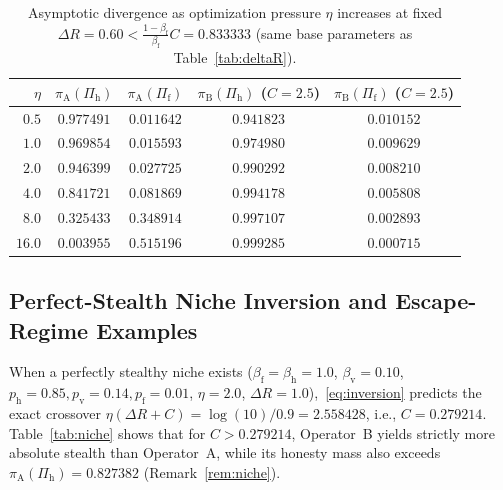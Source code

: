 \documentclass[11pt,a4paper]{article}
\begin{document}
\begin{table}[ht]
\centering
\caption{Asymptotic divergence as optimization pressure $\eta$ increases at fixed $\Delta R = 0.60 < \frac{1-\beta_{\mathrm{f}}}{\beta_{\mathrm{f}}}C = 0.833333$ (same base parameters as Table~\ref{tab:deltaR}).}
\label{tab:eta}
\small
\begin{tabular}{@{}rcccc@{}}
\toprule
$\eta$ & $\pi_{\mathrm{A}}(\Pi_{\mathrm{h}})$ & $\pi_{\mathrm{A}}(\Pi_{\mathrm{f}})$ & $\pi_{\mathrm{B}}(\Pi_{\mathrm{h}})$ ($C=2.5$) & $\pi_{\mathrm{B}}(\Pi_{\mathrm{f}})$ ($C=2.5$) \\
\midrule
$0.5$ & $0.977491$ & $0.011642$ & $0.941823$ & $0.010152$ \\
$1.0$ & $0.969854$ & $0.015593$ & $0.974980$ & $0.009629$ \\
$2.0$ & $0.946399$ & $0.027725$ & $0.990292$ & $0.008210$ \\
$4.0$ & $0.841721$ & $0.081869$ & $0.994178$ & $0.005808$ \\
$8.0$ & $0.325433$ & $0.348914$ & $0.997107$ & $0.002893$ \\
$16.0$ & $\mathbf{0.003955}$ & $\mathbf{0.515196}$ & $\mathbf{0.999285}$ & $\mathbf{0.000715}$ \\
\bottomrule
\end{tabular}
\end{table}

\subsection{Perfect-Stealth Niche Inversion and Escape-Regime Examples}

When a perfectly stealthy niche exists ($\beta_{\mathrm{f}} = \beta_{\mathrm{h}} = 1.0$, $\beta_{\mathrm{v}} = 0.10$, $p_{\mathrm{h}}=0.85, p_{\mathrm{v}}=0.14, p_{\mathrm{f}}=0.01$, $\eta = 2.0$, $\Delta R = 1.0$),~\eqref{eq:inversion} predicts the exact crossover $\eta(\Delta R + C) = \log(10)/0.9 = 2.558428$, i.e., $C = 0.279214$. Table~\ref{tab:niche} shows that for $C > 0.279214$, Operator~B yields strictly more absolute stealth than Operator~A, while its honesty mass also exceeds $\pi_{\mathrm{A}}(\Pi_{\mathrm{h}}) = 0.827382$ (Remark~\ref{rem:niche}).
\end{document}
